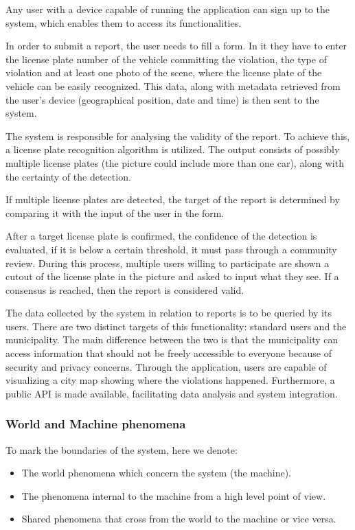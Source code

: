 Any user with a device capable of running the application can sign up to the system, which enables them to access its functionalities.

In order to submit a report, the user needs to fill a form. In it they have to enter the license plate number of the vehicle committing the violation, the type of violation and at least one photo of the scene, where the license plate of the vehicle can be easily recognized. This data, along with metadata retrieved from the user's device (geographical position, date and time) is then sent to the system.

The system is responsible for analysing the validity of the report. To achieve this, a license plate recognition algorithm is utilized. The output consists of possibly multiple license plates (the picture could include more than one car), along with the certainty of the detection.

If multiple license plates are detected, the target of the report is determined by comparing it with the input of the user in the form.

After a target license plate is confirmed, the confidence of the detection is evaluated, if it is below a certain threshold, it must pass through a community review. During this process, multiple users willing to participate are shown a cutout of the license plate in the picture and asked to input what they see. If a consensus is reached, then the report is considered valid.

The data collected by the system in relation to reports is to be queried by its users. There are two distinct targets of this functionality: standard users and the municipality. The main difference between the two is that the municipality can access information that should not be freely accessible to everyone because of security and privacy concerns. Through the application, users are capable of visualizing a city map showing where the violations happened. Furthermore, a public API is made available, facilitating data analysis and system integration.

\subsubsection{World and Machine phenomena}
To mark the boundaries of the system, here we denote:
    \begin{itemize}
        \item The world phenomena which concern the system (the machine).
        \item The phenomena internal to the machine from a high level point of view.
        \item Shared phenomena that cross from the world to the machine or vice versa.
    \end{itemize}

